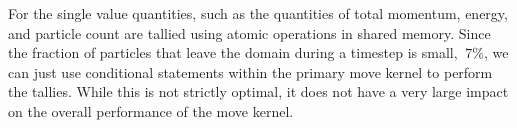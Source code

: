 	For the single value quantities, such as the quantities of total momentum, energy, and particle count are tallied using atomic operations in shared memory. Since the fraction of particles that leave the domain during a timestep is small, $~7\%$, we can just use conditional statements within the primary move kernel to perform the tallies. While this is not strictly optimal, it does not have a very large impact on the overall performance of the move kernel. 






